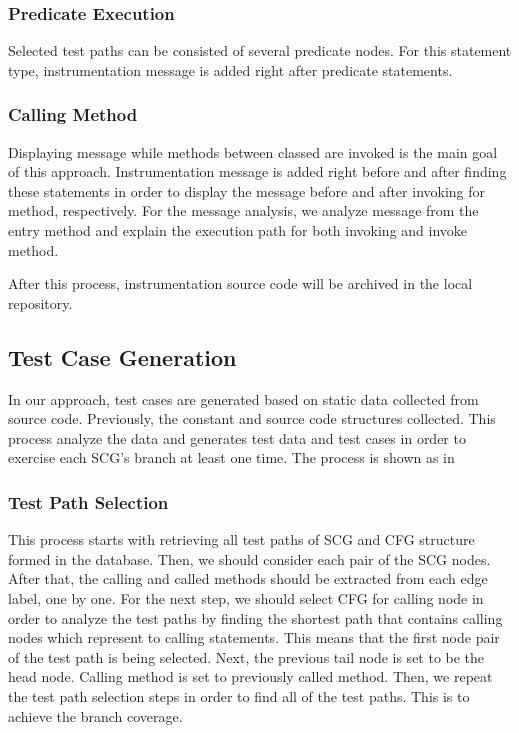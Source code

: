 \subsubsection{Predicate Execution}
Selected test paths can be consisted of several predicate nodes. 
For this statement type, instrumentation message 
is added right after predicate statements.

\subsubsection{Calling Method}
Displaying message while methods between classed are invoked 
is the main goal of this approach. Instrumentation message 
is added right before and after finding these statements 
in order to display the message before and after invoking 
for method, respectively. For the message analysis, we analyze 
message from the entry method and explain the execution path 
for both invoking and invoke method.

After this process, instrumentation source code 
will be archived in the local repository.

\subsection{Test Case Generation}

In our approach, test cases are generated based on 
static data collected from source code. Previously, the constant 
and source code structures collected. This process analyze the data 
and generates test data and test cases in order to exercise 
each SCG’s branch at least one time. The process 
is shown as in 

\subsubsection{Test Path Selection}
This process starts with retrieving all test paths of SCG and CFG 
structure formed in the database. Then, we should consider 
each pair of the SCG nodes. After that, the calling and called methods 
should be extracted from each edge label, one by one. For the next step, 
we should select CFG for calling node in order to analyze 
the test paths by finding the shortest path that contains calling nodes 
which represent to calling statements. This means that the first node pair 
of the test path is being selected. Next, the previous tail node 
is set to be the head node. Calling method is set to previously 
called method. Then, we repeat the test path selection steps in order to 
find all of the test paths. This is to achieve the branch coverage.

